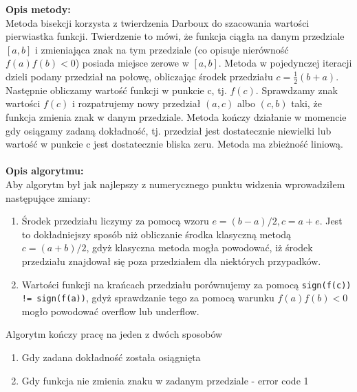 \documentclass[12pt]{article}
\begin{document}
\noindent \textbf{Opis metody:}\\
Metoda bisekcji korzysta z twierdzenia Darboux do szacowania wartości pierwiastka funkcji. Twierdzenie to mówi, że funkcja ciągła na danym przedziale $[a, b]$ i zmieniająca znak na tym przedziale (co opisuje nierówność $f(a)f(b) < 0$) posiada miejsce zerowe w $[a,b]$. Metoda w pojedynczej iteracji dzieli podany przedział na połowę, obliczając środek przedziału $c=\frac{1}{2}(b+a)$. Następnie obliczamy wartość funkcji w punkcie c, tj. $f(c)$. Sprawdzamy znak wartości $f(c)$ i rozpatrujemy nowy przedział $(a, c)$ albo $(c, b)$ taki, że funkcja zmienia znak w danym przedziale. Metoda kończy działanie w momencie gdy osiągamy zadaną dokładność, tj. przedział jest dostatecznie niewielki lub wartość w punkcie c jest dostatecznie bliska zeru. Metoda ma zbieżność liniową.
\\
\\
\noindent \textbf{Opis algorytmu:}\\
Aby algorytm był jak najlepszy z numerycznego punktu widzenia wprowadziłem następujące zmiany:
\begin{enumerate}
	\item Środek przedziału liczymy za pomocą wzoru $e=(b-a)/2, c=a+e$. Jest to dokładniejszy sposób niż obliczanie środka klasyczną metodą $c=(a+b)/2$, gdyż klasyczna metoda mogła powodować, iż środek przedziału znajdował się poza przedziałem dla niektórych przypadków.
	\item Wartości funkcji na krańcach przedziału porównujemy za pomocą \texttt{sign(f(c)) != sign(f(a))}, gdyż sprawdzanie tego za pomocą warunku $f(a)f(b) < 0$ mogło powodować overflow lub underflow.
\end{enumerate}
Algorytm kończy pracę na jeden z dwóch sposobów
\begin{enumerate}
\item Gdy zadana dokładność została osiągnięta
\item Gdy funkcja nie zmienia znaku w zadanym przedziale - error code 1
\end{enumerate}
\end{document}
